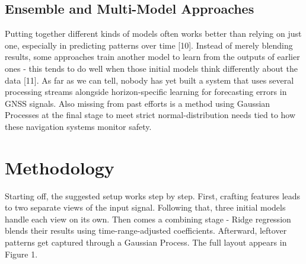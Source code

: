 \documentclass[conference]{IEEEtran}
\begin{document}
\subsection{Ensemble and Multi-Model Approaches}

Putting together different kinds of models often works better than relying on just one, especially in predicting patterns over time [10]. Instead of merely blending results, some approaches train another model to learn from the outputs of earlier ones - this tends to do well when those initial models think differently about the data [11]. As far as we can tell, nobody has yet built a system that uses several processing streams alongside horizon-specific learning for forecasting errors in GNSS signals. Also missing from past efforts is a method using Gaussian Processes at the final stage to meet strict normal-distribution needs tied to how these navigation systems monitor safety.

\section{Methodology}
Starting off, the suggested setup works step by step. First, crafting features leads to two separate views of the input signal. Following that, three initial models handle each view on its own. Then comes a combining stage - Ridge regression blends their results using time-range-adjusted coefficients. Afterward, leftover patterns get captured through a Gaussian Process. The full layout appears in Figure 1.
\end{document}

